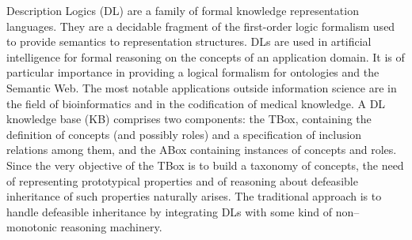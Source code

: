 \documentclass[a4paper, 11pt, oneside]{duthesis}
\begin{document}
Description Logics (DL) are a family of formal knowledge representation languages. They are a decidable fragment of the first-order logic formalism used to provide semantics to representation structures.
DLs are used in artificial intelligence for formal reasoning on the concepts of an application domain. It is of particular importance in providing a logical formalism for ontologies and the Semantic Web. The most notable applications outside information science are in the field of bioinformatics and in the codification of medical knowledge. A DL knowledge base (KB) comprises two components: the TBox, containing the definition of concepts (and possibly roles) and a specification of inclusion relations among them, and the ABox containing instances of concepts and roles. Since the very objective of the TBox is to build a taxonomy of concepts, the need of representing prototypical properties and of reasoning about defeasible inheritance of such properties naturally arises. The traditional approach is to handle defeasible inheritance by integrating DLs with some kind of non--monotonic reasoning machinery.



%
\end{document}

